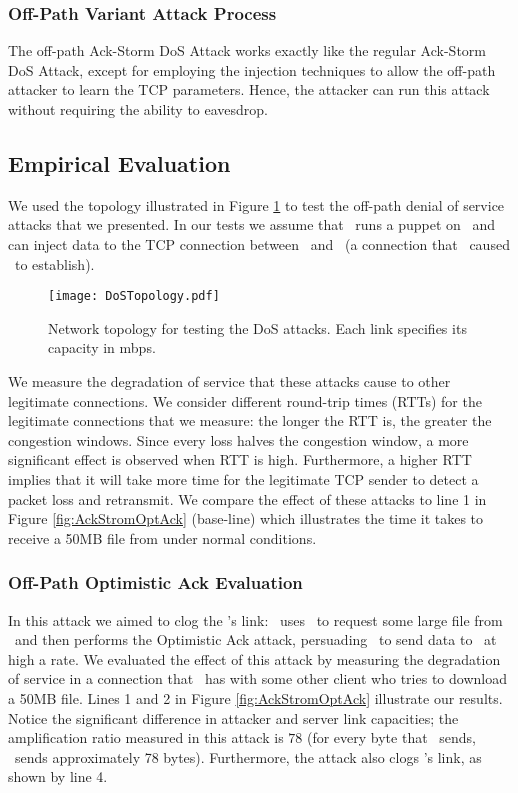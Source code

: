 \documentclass[conference]{IEEEtran}
\newcommand{\fullppr}[1]{}
\begin{document}
\subsubsection{Off-Path Variant Attack Process}
The off-path Ack-Storm DoS Attack works exactly like the regular Ack-Storm DoS Attack, except for employing the injection techniques to allow the off-path attacker to learn the TCP parameters. Hence, the attacker can run this attack without requiring the ability to eavesdrop. 

\subsection{Empirical Evaluation}
We used the topology illustrated in Figure \ref{fig:dosmodel} to test the off-path denial of service attacks that we presented. In our tests we assume that \mal\ runs a puppet on \wini\ and can inject data to the TCP connection between \wini\ and \lin\ (a connection that \mal\ caused \wini\ to establish).

\begin{figure}
  \begin{center}
    \texttt{[image: DoSTopology.pdf]}
  \end{center}
  \caption{Network topology for testing the DoS attacks. Each link specifies its capacity in mbps.}
  \label{fig:dosmodel}
\end{figure}

We measure the degradation of service that these attacks cause to other legitimate connections. We consider different round-trip times (RTTs) for the legitimate connections that we measure: the longer the RTT is, the greater the congestion windows. Since every loss halves the congestion window, a more significant effect is observed when RTT is high. Furthermore, a higher RTT implies that it will take more time for the legitimate TCP sender to detect a packet loss and retransmit. We compare the effect of these attacks to line 1 in Figure \ref{fig:AckStromOptAck} (base-line) which illustrates the time it takes \wini* to receive a 50MB file from \lin* under normal conditions.

\subsubsection{Off-Path Optimistic Ack Evaluation}
In this attack we aimed to clog the \lin's link: \mal\ uses \wini\ to request some large file from \lin\ and then performs the Optimistic Ack attack, persuading \lin\ to send data to \wini\ at high a rate. We evaluated the effect of this attack by measuring the degradation of service in a connection that \lin\ has with some other client \wini* who tries to download a 50MB file\fullppr{ (see network topology in Figure \ref{fig:dosmodel})}. Lines 1 and 2 in Figure \ref{fig:AckStromOptAck} illustrate our results. Notice the significant difference in attacker and server link capacities; the amplification ratio measured in this attack is $78$ (for every byte that \mal\ sends, \lin\ sends approximately 78 bytes). Furthermore, the attack also clogs \wini's link, as shown by line 4.
\end{document}
